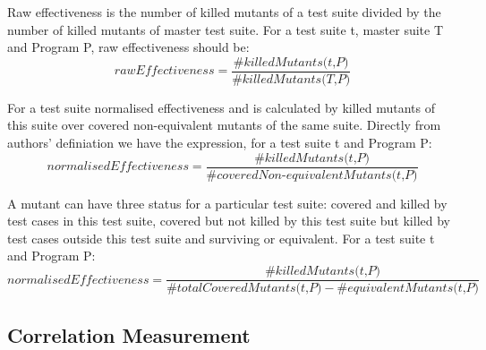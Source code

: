 Raw effectiveness is the number of killed mutants of a test suite divided by the number of killed mutants of master test suite. For a test suite t, master suite T and Program P, raw effectiveness should be:
\[\textit{rawEffectiveness} = \frac{\#\textit{killedMutants(t,P)}}{\#\textit{killedMutants(T,P)}}\]

For a test suite normalised effectiveness and is calculated by killed mutants of this suite over covered non-equivalent mutants of the same suite. Directly from authors' definiation we have the expression, for a test suite t and Program P:
\[\textit{normalisedEffectiveness} = \frac{\#\textit{killedMutants(t,P)}}{\#\textit{coveredNon-equivalentMutants(t,P)}}\]

A mutant can have three status for a particular test suite: covered and killed by test cases in this test suite, covered but not killed by this test suite but killed by test cases outside this test suite and surviving or equivalent. For a test suite t and Program P:
\[\textit{normalisedEffectiveness} = \frac{\#\textit{killedMutants(t,P)}}{\#\textit{totalCoveredMutants(t,P)} - \#\textit{equivalentMutants(t,P)}}\]
\subsection{Correlation Measurement}
